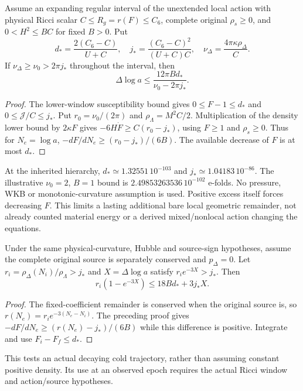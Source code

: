 \documentclass[12pt,a4paper]{article}
\begin{document}
\begin{theorem}
\label{p8:thm:v2203-local-duration}
Assume an expanding regular interval of the unextended local action
with physical Ricci scalar $C\le R_g=r(F)\le C_6$, complete original
$\rho_s\ge0$, and $0<H^2\le BC$ for fixed $B>0$. Put
\[
 d_*=\frac{2(C_6-C)}{U+C},\quad
 j_*=\frac{(C_6-C)^2}{(U+C)C},\quad
 \nu_\Delta=\frac{4\pi\kappa\rho_\Delta}{C}.
\]
If $\nu_\Delta\ge\nu_0>2\pi j_*$ throughout the interval, then
\begin{equation}
\label{p8:eq:v2203-local-duration}
 \boxed{\Delta\log a\le
 \frac{12\pi B d_*}{\nu_0-2\pi j_*}.}
\end{equation}
\end{theorem}
\begin{proof}
The lower-window susceptibility bound gives
$0\le F-1\le d_*$ and $0\le\mathcal J/C\le j_*$.
Put $r_0=\nu_0/(2\pi)$ and $\rho_\Lambda=M^2C/2$.
Multiplication of the density lower bound by $2\kappa F$ gives
$-6H\dot F\ge C(r_0-j_*)$, using $F\ge1$ and $\rho_s\ge0$.
Thus for $N_e=\log a$,
$-dF/dN_e\ge(r_0-j_*)/(6B)$.
The available decrease of $F$ is at most $d_*$.
\end{proof}
At the inherited hierarchy,
$d_*\simeq1.32551\,10^{-103}$ and $j_*\simeq1.04183\,10^{-86}$.
The illustrative $\nu_0=2$, $B=1$ bound is
$2.49853263536\,10^{-102}$ e-folds.
No pressure, WKB or monotonic-curvature assumption is used.
Positive excess itself forces decreasing $F$. This limits a lasting
additional bare local geometric remainder, not already counted material
energy or a derived mixed/nonlocal action changing the equations.

\begin{corollary}
\label{p8:cor:v2203-integrated-local-cold-budget}
Under the same physical-curvature, Hubble and source-sign hypotheses,
assume the complete original source is separately conserved and
$p_\Delta=0$. Let $r_i=\rho_\Delta(N_i)/\rho_\Lambda>j_*$ and
$X=\Delta\log a$ satisfy $r_i e^{-3X}>j_*$. Then
\begin{equation}
\label{p8:eq:v2203-integrated-local-cold-budget}
 \boxed{r_i(1-e^{-3X})\le18Bd_*+3j_*X.}
\end{equation}
\end{corollary}
\begin{proof}
The fixed-coefficient remainder is conserved when the original source
is, so $r(N_e)=r_i e^{-3(N_e-N_i)}$.
The preceding proof gives
$-dF/dN_e\ge(r(N_e)-j_*)/(6B)$ while this difference is positive.
Integrate and use $F_i-F_f\le d_*$.
\end{proof}
This tests an actual decaying cold trajectory, rather than assuming
constant positive density. Its use at an observed epoch requires the
actual Ricci window and action/source hypotheses.
\end{document}
